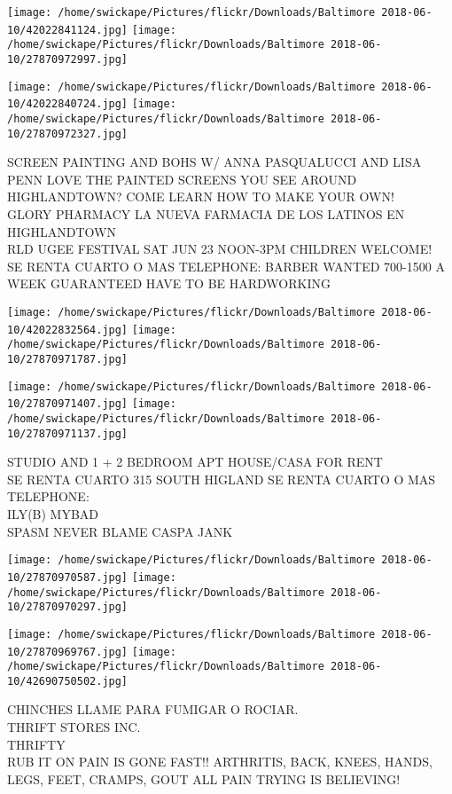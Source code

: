 \documentclass[10pt,letterpaper]{article}
\begin{document}
\texttt{[image: /home/swickape/Pictures/flickr/Downloads/Baltimore 2018-06-10/42022841124.jpg]}
\texttt{[image: /home/swickape/Pictures/flickr/Downloads/Baltimore 2018-06-10/27870972997.jpg]}

\texttt{[image: /home/swickape/Pictures/flickr/Downloads/Baltimore 2018-06-10/42022840724.jpg]}
\texttt{[image: /home/swickape/Pictures/flickr/Downloads/Baltimore 2018-06-10/27870972327.jpg]}

SCREEN PAINTING AND BOHS W/ ANNA PASQUALUCCI AND LISA PENN LOVE THE PAINTED SCREENS YOU SEE AROUND HIGHLANDTOWN?  COME LEARN HOW TO MAKE YOUR OWN!\\
GLORY PHARMACY LA NUEVA FARMACIA DE LOS LATINOS EN HIGHLANDTOWN\\
RLD UGEE FESTIVAL SAT JUN 23 NOON{-}3PM CHILDREN WELCOME!\\
SE RENTA CUARTO O MAS TELEPHONE: BARBER WANTED 700{-}1500 A WEEK GUARANTEED HAVE TO BE HARDWORKING\\
\pagebreak

\texttt{[image: /home/swickape/Pictures/flickr/Downloads/Baltimore 2018-06-10/42022832564.jpg]}
\texttt{[image: /home/swickape/Pictures/flickr/Downloads/Baltimore 2018-06-10/27870971787.jpg]}

\texttt{[image: /home/swickape/Pictures/flickr/Downloads/Baltimore 2018-06-10/27870971407.jpg]}
\texttt{[image: /home/swickape/Pictures/flickr/Downloads/Baltimore 2018-06-10/27870971137.jpg]}

STUDIO AND 1 + 2 BEDROOM APT HOUSE/CASA FOR RENT\\
SE RENTA CUARTO 315 SOUTH HIGLAND SE RENTA CUARTO O MAS TELEPHONE:\\
ILY(B) MYBAD\\
SPASM NEVER BLAME CASPA JANK\\
\pagebreak

\texttt{[image: /home/swickape/Pictures/flickr/Downloads/Baltimore 2018-06-10/27870970587.jpg]}
\texttt{[image: /home/swickape/Pictures/flickr/Downloads/Baltimore 2018-06-10/27870970297.jpg]}

\texttt{[image: /home/swickape/Pictures/flickr/Downloads/Baltimore 2018-06-10/27870969767.jpg]}
\texttt{[image: /home/swickape/Pictures/flickr/Downloads/Baltimore 2018-06-10/42690750502.jpg]}

CHINCHES LLAME PARA FUMIGAR O ROCIAR.\\
THRIFT STORES INC.\\
THRIFTY\\
RUB IT ON PAIN IS GONE FAST!! ARTHRITIS, BACK, KNEES, HANDS, LEGS, FEET, CRAMPS, GOUT ALL PAIN TRYING IS BELIEVING!\\
\pagebreak
\end{document}
